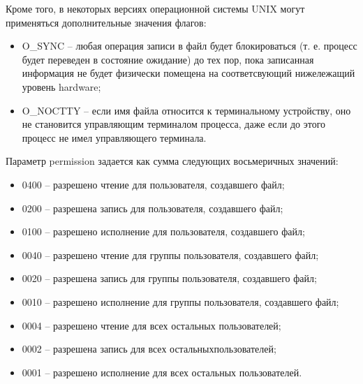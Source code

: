 \documentclass[a4paper]{article}
\begin{document}
Кроме того, в некоторых версиях операционной системы UNIX могут применяться дополнительные значения флагов:
\begin{itemize}
  \item O\_SYNC – любая операция записи в файл будет блокироваться (т. е. процесс будет переведен в состояние ожидание) до тех пор, пока записанная информация не будет физически помещена на соответсвующий нижележащий уровень hardware;
  \item O\_NOCTTY – если имя файла относится к терминальному устройству, оно не становится управляющим терминалом процесса, даже если до этого процесс не имел управляющего терминала.
\end{itemize}

Параметр permission задается как сумма следующих восьмеричных значений:
\begin{itemize}
  \item 0400 – разрешено чтение для пользователя, создавшего файл;
  \item 0200 – разрешена запись для пользователя, создавшего файл;
  \item 0100 – разрешено исполнение для пользователя, создавшего файл;
  \item 0040 – разрешено чтение для группы пользователя, создавшего файл;
  \item 0020 – разрешена запись для группы пользователя, создавшего файл;
  \item 0010 – разрешено исполнение для группы пользователя, создавшего файл;
  \item 0004 – разрешено чтение для всех остальных пользователей;
  \item 0002 – разрешена запись для всех остальныхпользователей;
  \item 0001 – разрешено исполнение для всех остальных пользователей.
\end{itemize}
\end{document}
